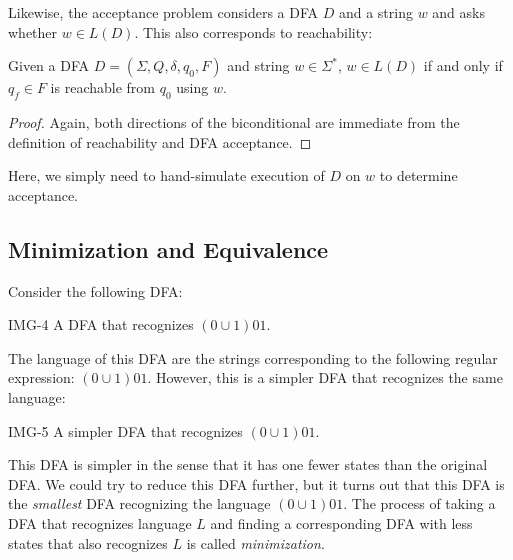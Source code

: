 \documentclass[11pt]{book}
\begin{document}
Likewise, the acceptance problem considers a DFA $D$ and a string $w$ and asks whether $w \in L(D)$.
This also corresponds to reachability:

\begin{thm}
  Given a DFA $D = (\Sigma, Q, \delta, q_0, F)$ and string $w \in \Sigma^*$, $w \in L(D)$ if and only if $q_f \in F$ is reachable from $q_0$ using $w$.
\end{thm}
\begin{proof}
  Again, both directions of the biconditional are immediate from the definition of reachability and DFA acceptance.
\end{proof}

Here, we simply need to hand-simulate execution of $D$ on $w$ to determine acceptance.

\subsection*{Minimization and Equivalence}

Consider the following DFA:

IMG-4 A DFA that recognizes $(0 \cup 1)01$.

The language of this DFA are the strings corresponding to the following regular expression: $(0 \cup 1)01$.
However, this is a simpler DFA that recognizes the same language:

IMG-5 A simpler DFA that recognizes $(0 \cup 1)01$.

This DFA is simpler in the sense that it has one fewer states than the original DFA.
We could try to reduce this DFA further, but it turns out that this DFA is the \emph{smallest} DFA recognizing the language $(0 \cup 1)01$.
The process of taking a DFA that recognizes language $L$ and finding a corresponding DFA with less states that also recognizes $L$ is called \emph{minimization}.
\end{document}
